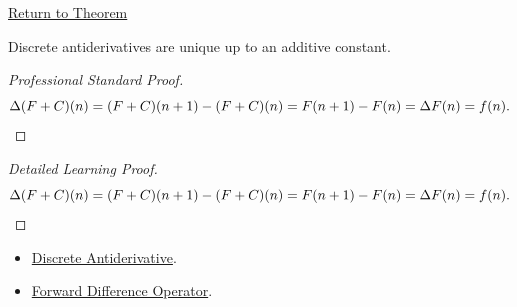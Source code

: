\newpage
{}
\label{prf:constant-of-integration}

\begin{remark*}[Return]
\hyperref[prop:constant-of-integration]{Return to Theorem}
\end{remark*}

\begin{proposition*}
Discrete antiderivatives are unique up to an additive constant.
\end{proposition*}

\begin{proof}[Professional Standard Proof]
\LRAProofBodyStart
\[
\Delta(F+C)(n) = (F+C)(n+1) - (F+C)(n)
= F(n+1)-F(n) = \Delta F(n) = f(n). \qedhere
\]
\end{proof}

\begin{proof}[Detailed Learning Proof]
\LRAProofBodyStart
\[
\Delta(F+C)(n) = (F+C)(n+1) - (F+C)(n)
= F(n+1)-F(n) = \Delta F(n) = f(n). \qedhere
\]
\end{proof}

\begin{remark*}
\end{remark*}

\begin{dependencies}
\begin{itemize}
  \item \hyperref[def:discrete-antiderivative]{Discrete Antiderivative}.
  \item \hyperref[def:forward-difference]{Forward Difference Operator}.
\end{itemize}
\end{dependencies}
\clearpage
